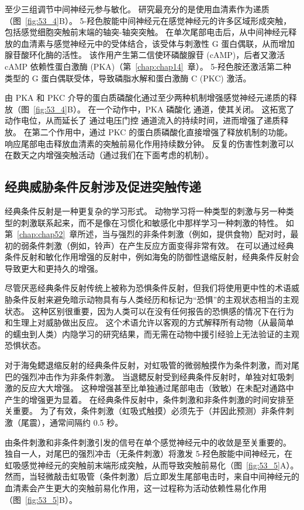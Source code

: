 至少三组调节中间神经元参与敏化。
研究最充分的是使用血清素作为递质（图~\ref{fig:53_4}B）。
5-羟色胺能中间神经元在感觉神经元的许多区域形成突触，包括感觉细胞突触前末端的轴突-轴突突触。
在单次尾部电击后，从中间神经元释放的血清素与感觉神经元中的受体结合，该受体与刺激性 G 蛋白偶联，从而增加腺苷酸环化酶的活性。
该作用产生第二信使环磷酸腺苷 (cAMP)，后者又激活 cAMP 依赖性蛋白激酶 (PKA)（第~\ref{chap:chap14}~章）。
5-羟色胺还激活第二种类型的 G 蛋白偶联受体，导致磷脂水解和蛋白激酶 C (PKC) 激活。


由 PKA 和 PKC 介导的蛋白质磷酸化通过至少两种机制增强感觉神经元递质的释放（图~\ref{fig:53_4}B）。
在一个动作中，PKA 磷酸化  通道，使其关闭。 这拓宽了动作电位，从而延长了  通过电压门控  通道流入的持续时间，进而增强了递质释放。
在第二个作用中，通过 PKC 的蛋白质磷酸化直接增强了释放机制的功能。
响应尾部电击释放血清素的突触前易化作用持续数分钟。
反复的伤害性刺激可以在数天之内增强突触活动（通过我们在下面考虑的机制）。



\subsection{经典威胁条件反射涉及促进突触传递}

经典条件反射是一种更复杂的学习形式。
动物学习将一种类型的刺激与另一种类型的刺激联系起来，而不是像在习惯化和敏感化中那样学习一种刺激的特性。
如第~\ref{chap:chap52}~章所述，当与强烈的非条件刺激（例如，提供食物）配对时，最初的弱条件刺激（例如，铃声）在产生反应方面变得非常有效。
在可以通过经典条件反射和敏化作用增强的反射中，例如海兔的防御性退缩反射，经典条件反射会导致更大和更持久的增强。


尽管厌恶经典条件反射传统上被称为恐惧条件反射，但我们将使用更中性的术语威胁条件反射来避免暗示动物具有与人类经历和标记为“恐惧”的主观状态相当的主观状态。 这种区别很重要，因为人类可以在没有任何报告的恐惧感的情况下在行为和生理上对威胁做出反应。
这个术语允许以客观的方式解释所有动物（从最简单的蠕虫到人类）内隐学习的研究结果，而无需在动物中援引经验上无法验证的主观恐惧状态。


对于海兔鳃退缩反射的经典条件反射，对虹吸管的微弱触摸作为条件刺激，而对尾巴的强烈冲击作为非条件刺激。
当退鳃反射受到经典条件反射时，单独对虹吸刺激的反应大大增强。
这种增强甚至比单独通过尾部电击（致敏）在未配对通路中产生的增强更为显着。 
在经典条件反射中，条件刺激和非条件刺激的时间安排至关重要。
为了有效，条件刺激（虹吸式触摸）必须先于（并因此预测）非条件刺激（尾震），通常间隔约 0.5 秒。


由条件刺激和非条件刺激引发的信号在单个感觉神经元中的收敛是至关重要的。
独自一人，对尾巴的强烈冲击（无条件刺激）将激发 5-羟色胺能中间神经元，在虹吸感觉神经元的突触前末端形成突触，从而导致突触前易化（图~\ref{fig:53_5}A）。
然而，当轻微敲击虹吸管（条件刺激）后立即发生尾部电击时，来自中间神经元的血清素会产生更大的突触前易化作用，这一过程称为活动依赖性易化作用（图~\ref{fig:53_5}B）。


